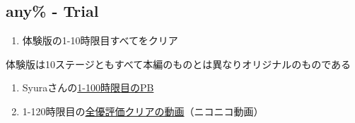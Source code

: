 \subsection{any\% - Trial}
\begin{enumerate}[label={\sarrow}]
\item 体験版の1-10時限目すべてをクリア
\end{enumerate}
\begin{marker}
体験版は10ステージともすべて本編のものとは異なりオリジナルのものである
\end{marker}



\begin{enumerate}[label={\sarrow}]
\item Syuraさんの\href{https://pastebin.com/0nH3mJSZ}{1-100時限目のPB}
\item 1-120時限目の\href{https://www.nicovideo.jp/watch/sm18710850}{全優評価クリアの動画}（ニコニコ動画）
\end{enumerate}



